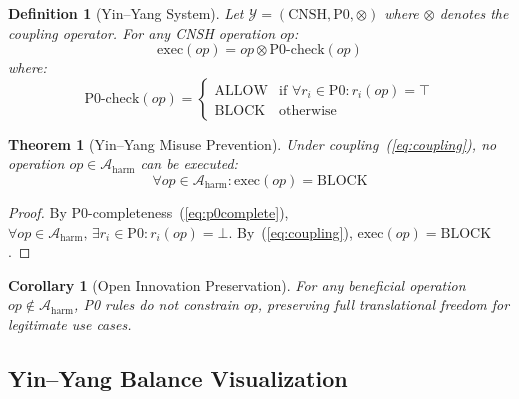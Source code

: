 \documentclass[conference]{IEEEtran}
\newtheorem{theorem}{Theorem}
\newtheorem{definition}{Definition}
\newtheorem{corollary}{Corollary}
\begin{document}
\begin{definition}[Yin--Yang System]
Let $\mathcal{Y} = (\text{CNSH}, \text{P0}, \otimes)$ where
$\otimes$ denotes the coupling operator.
For any CNSH operation $op$:
\begin{equation}
  \text{exec}(op) = op \otimes \text{P0-check}(op)
  \label{eq:coupling}
\end{equation}
where:
\begin{equation}
  \text{P0-check}(op) =
  \begin{cases}
    \text{ALLOW} & \text{if } \forall r_i \in \text{P0}:
      r_i(op) = \top \\
    \text{BLOCK} & \text{otherwise}
  \end{cases}
\end{equation}
\end{definition}

\begin{theorem}[Yin--Yang Misuse Prevention]
Under coupling~(\ref{eq:coupling}), no operation
$op \in \mathcal{A}_{\text{harm}}$ can be executed:
\begin{equation}
  \forall op \in \mathcal{A}_{\text{harm}}:
  \text{exec}(op) = \text{BLOCK}
\end{equation}
\end{theorem}

\begin{proof}
By P0-completeness~(\ref{eq:p0complete}),
$\forall op \in \mathcal{A}_{\text{harm}},\,
\exists r_i \in \text{P0}: r_i(op) = \bot$.
By~(\ref{eq:coupling}), $\text{exec}(op) = \text{BLOCK}$.
\end{proof}

\begin{corollary}[Open Innovation Preservation]
For any beneficial operation $op \notin \mathcal{A}_{\text{harm}}$,
P0 rules do not constrain $op$, preserving full translational
freedom for legitimate use cases.
\end{corollary}

\subsection{Yin--Yang Balance Visualization}
\end{document}
